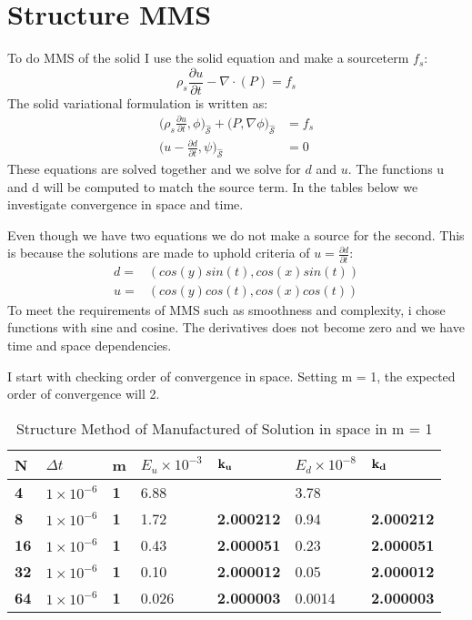 \section{Structure MMS}
To do MMS of the solid I use the solid equation and make a sourceterm $f_s$:
$$\rho_s \frac{\partial u}{\partial t} - \nabla \cdot ( P ) = f_s $$
The solid variational formulation is written as:
\begin{align}
\big(\rho_s \frac{\partial u}{\partial t},\phi \big)_{\mathcal{\hat{S}}} + \big(P, \nabla \phi \big)_{\mathcal{\hat{S}}} &=f_s \\
\big( u- \frac{\partial d}{\partial t} ,\psi \big)_{\mathcal{\hat{S}}} &= 0 
\end{align}
These equations are solved together and we solve for $d$ and $u$. The functions u and d will be computed to match the source term. In the tables below we investigate convergence in space and time. \newline

Even though we have two equations we do not make a source for the second. This is because the solutions are made to uphold criteria of $u = \frac{\partial d}{\partial t}$:
\begin{align*}
d =& ( cos(y)sin(t) , cos(x)sin(t) )\\
u =& ( cos(y)cos(t), cos(x)cos(t) )
\end{align*}
To meet the requirements of MMS such as smoothness and complexity, i chose functions with sine and cosine. The derivatives does not become zero and we have time and space dependencies. 
\newline

I start with checking order of convergence in space. Setting m = 1, the expected order of convergence will 2. 

\begin{table}[H]
\centering
\caption{Structure Method of Manufactured of Solution in space in m = 1}
\label{my-label}
\begin{tabular}{|l|l|l|l|l|l|l|}
\hline
\textbf{N}  & $\Delta t$  & \textbf{m} & $E_u \times 10^{-3}$ & $\bold{k_u}$    & $E_d \times 10^{-8}$ & $\bold{k_d}$    \\ \hline
\textbf{4}  & $1\times10^{-6}$ & \textbf{1} & 6.88                 & \textbf{}         & 3.78                 & \textbf{}         \\ \hline
\textbf{8}  & $1\times10^{-6}$ & \textbf{1} & 1.72                 & \textbf{2.000212} & 0.94                 & \textbf{2.000212} \\ \hline
\textbf{16} & $1\times10^{-6}$ & \textbf{1} & 0.43                 & \textbf{2.000051} & 0.23                 & \textbf{2.000051} \\ \hline
\textbf{32} & $1\times10^{-6}$ & \textbf{1} & 0.10                 & \textbf{2.000012} & 0.05                 & \textbf{2.000012} \\ \hline
\textbf{64} & $1\times10^{-6}$ & \textbf{1} & 0.026                & \textbf{2.000003} & 0.0014               & \textbf{2.000003} \\ \hline
\end{tabular}
\end{table}

